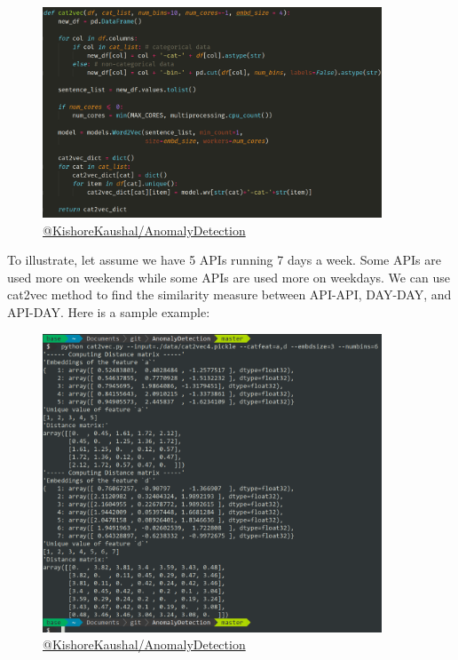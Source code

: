 \vspace{1em}
\begin{figure}[!ht]
    \label{fig:cat2vec-implementation}
    \centering
    \includegraphics[width=0.9\textwidth]{../fig/chapter4/cat2vec.png}
    {\href{https://github.com/KishoreKaushal/AnomalyDetection/blob/master/isolationforest/cat2vec.py}{@KishoreKaushal/AnomalyDetection}}
\end{figure}
\pagebreak

To illustrate, let assume we have 5 APIs running 7 days a week. Some APIs are used more on weekends while some APIs are used more on weekdays. We can use cat2vec method to find the similarity measure between API-API, DAY-DAY, and API-DAY. Here is a sample example:

\vspace{2em}
\begin{figure}[!ht]
    \label{fig:cat2vec-sample-run}
    \centering
    \includegraphics[width=0.9\textwidth]{../fig/chapter4/cat2vec-sample-run.png}
    {\href{https://github.com/KishoreKaushal/AnomalyDetection/blob/master/isolationforest/cat2vec.py}{@KishoreKaushal/AnomalyDetection}}
\end{figure}

